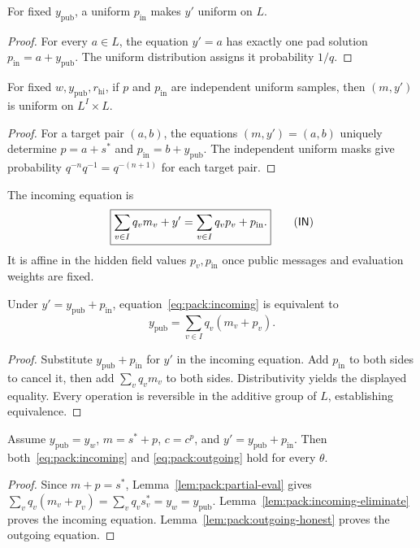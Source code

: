 \begin{lemma}\label{lem:pack:incoming-uniform}
For fixed $y_{\mathrm{pub}}$, a uniform
$p_{\mathrm{in}}$ makes $y'$ uniform on $L$.
\end{lemma}
\begin{proof}
For every $a\in L$, the equation $y'=a$
has exactly one pad solution
$p_{\mathrm{in}}=a+y_{\mathrm{pub}}$.
The uniform distribution assigns it probability $1/q$.
\end{proof}

\begin{lemma}\label{lem:pack:joint-uniform}
For fixed $w,y_{\mathrm{pub}},r_{\mathrm{hi}}$,
if $p$ and $p_{\mathrm{in}}$ are independent uniform
samples, then $(m,y')$ is uniform on $L^I\times L$.
\end{lemma}
\begin{proof}
For a target pair $(a,b)$, the equations
$(m,y')=(a,b)$ uniquely determine
$p=a+s^*$ and
$p_{\mathrm{in}}=b+y_{\mathrm{pub}}$.
The independent uniform masks give probability
$q^{-n}q^{-1}=q^{-(n+1)}$ for each target pair.
\end{proof}

\begin{definition}\label{def:pack:incoming-check}
The incoming equation is
\[
 \boxed{\sum_{v\in I}q_vm_v+y'
  =\sum_{v\in I}q_vp_v+p_{\mathrm{in}}.}
 \tag{$\mathsf{IN}$}\label{eq:pack:incoming}
\]
It is affine in the hidden field values $p_v,p_{\mathrm{in}}$
once public messages and evaluation weights are fixed.
\end{definition}

\begin{lemma}\label{lem:pack:incoming-eliminate}
Under $y'=y_{\mathrm{pub}}+p_{\mathrm{in}}$,
equation~\eqref{eq:pack:incoming} is equivalent to
\[
 \boxed{y_{\mathrm{pub}}=\sum_{v\in I}q_v(m_v+p_v).}
\]
\end{lemma}
\begin{proof}
Substitute $y_{\mathrm{pub}}+p_{\mathrm{in}}$
for $y'$ in the incoming equation.
Add $p_{\mathrm{in}}$ to both sides to cancel it,
then add $\sum_vq_vm_v$ to both sides.
Distributivity yields the displayed equality.
Every operation is reversible in the additive group
of $L$, establishing equivalence.
\end{proof}

\begin{theorem}\label{thm:pack:honest-interfaces}
Assume $y_{\mathrm{pub}}=y_w$,
$m=s^*+p$, $c=c^p$, and
$y'=y_{\mathrm{pub}}+p_{\mathrm{in}}$.
Then both~\eqref{eq:pack:incoming} and
\eqref{eq:pack:outgoing} hold for every $\theta$.
\end{theorem}
\begin{proof}
Since $m+p=s^*$,
Lemma~\ref{lem:pack:partial-eval} gives
$\sum_vq_v(m_v+p_v)=
\sum_vq_vs_v^*=y_w=y_{\mathrm{pub}}$.
Lemma~\ref{lem:pack:incoming-eliminate} proves
the incoming equation.
Lemma~\ref{lem:pack:outgoing-honest} proves
the outgoing equation.
\end{proof}

